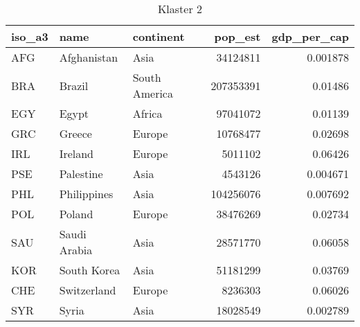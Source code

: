 \begin{table}[h!]
   \centering
   \caption{Klaster 2}
   \label{tab:cl2}
   \begin{tabular}{lllrr}
      \toprule
      iso\_a3 & name         & continent     & pop\_est  & gdp\_per\_cap \\
      \midrule
      AFG     & Afghanistan  & Asia          & 34124811  & 0.001878      \\
      BRA     & Brazil       & South America & 207353391 & 0.01486       \\
      EGY     & Egypt        & Africa        & 97041072  & 0.01139       \\
      GRC     & Greece       & Europe        & 10768477  & 0.02698       \\
      IRL     & Ireland      & Europe        & 5011102   & 0.06426       \\
      PSE     & Palestine    & Asia          & 4543126   & 0.004671      \\
      PHL     & Philippines  & Asia          & 104256076 & 0.007692      \\
      POL     & Poland       & Europe        & 38476269  & 0.02734       \\
      SAU     & Saudi Arabia & Asia          & 28571770  & 0.06058       \\
      KOR     & South Korea  & Asia          & 51181299  & 0.03769       \\
      CHE     & Switzerland  & Europe        & 8236303   & 0.06026       \\
      SYR     & Syria        & Asia          & 18028549  & 0.002789      \\
      \bottomrule
   \end{tabular}
\end{table}
